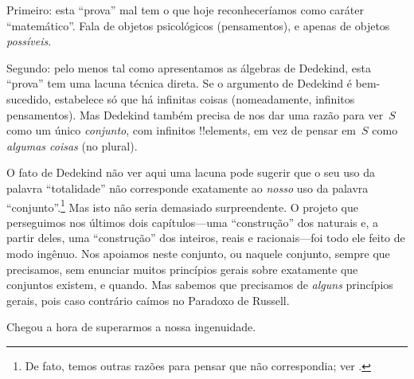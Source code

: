 \documentclass[../../../include/open-logic-section]{subfiles}
\begin{document}
Primeiro: esta ``prova'' mal tem o que hoje reconheceríamos como caráter
``matemático''. Fala de objetos psicológicos
(pensamentos), e apenas de objetos \emph{possíveis}.

Segundo: pelo menos tal como apresentamos as álgebras de Dedekind, esta
``prova'' tem uma lacuna técnica direta. Se o argumento de Dedekind é bem-sucedido,
estabelece só que há infinitas
coisas (nomeadamente, infinitos pensamentos). Mas Dedekind
também precisa de nos dar uma razão para ver~$S$ como um único \emph{conjunto},
com infinitos !!{element}s, em vez de pensar em~$S$ como
\emph{algumas coisas} (no plural).

O fato de Dedekind não ver aqui uma lacuna pode sugerir que o seu
uso da palavra ``totalidade'' não corresponde exatamente ao \emph{nosso} uso
da palavra ``conjunto''.\footnote{De fato, temos outras razões para pensar
que não correspondia; ver \citet[p.~23]{Potter2004}.} Mas isto não seria
demasiado surpreendente. O projeto que perseguimos nos últimos dois
capítulos---uma ``construção'' dos naturais e, a partir deles, uma
``construção'' dos inteiros, reais e racionais---foi todo ele
feito de modo ingênuo. Nos apoiamos neste conjunto, ou naquele
conjunto, sempre que precisamos, sem enunciar muitos princípios gerais
sobre exatamente que conjuntos existem, e quando. Mas sabemos
que precisamos de \emph{alguns} princípios gerais, pois caso contrário caímos
no Paradoxo de Russell.

Chegou a hora de superarmos a nossa ingenuidade.
\end{document}
